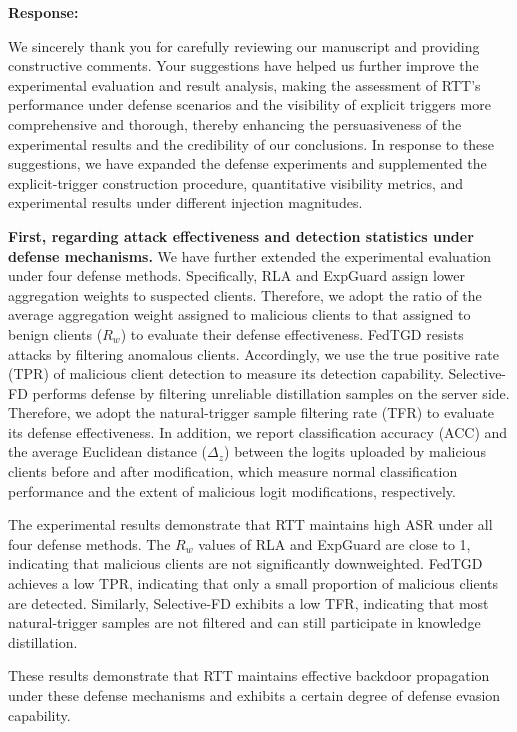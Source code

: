 \documentclass[11pt,a4paper]{article}
\newcommand{\manualindent}{\par\noindent\hspace*{1.5em}\ignorespaces}
\newcommand{\authorresponse}[1]{%
  {\bfseries\color{replyblue}Response:}\par
  #1\par\vspace{0.35em}%
}
\begin{document}
\authorresponse{\manualindent We sincerely thank you for carefully reviewing our manuscript and providing constructive comments.
Your suggestions have helped us further improve the experimental evaluation and result analysis, making the assessment of RTT's performance under defense scenarios and the visibility of explicit triggers more comprehensive and thorough, thereby enhancing the persuasiveness of the experimental results and the credibility of our conclusions. 
In response to these suggestions, we have expanded the defense experiments and supplemented the explicit-trigger construction procedure, quantitative visibility metrics, and experimental results under different injection magnitudes.

\manualindent \textbf{First, regarding attack effectiveness and detection statistics under defense mechanisms.}
We have further extended the experimental evaluation under four defense methods. 
Specifically, RLA and ExpGuard assign lower aggregation weights to suspected clients. Therefore, we adopt the ratio of the average aggregation weight assigned to malicious clients to that assigned to benign clients ($R_w$) to evaluate their defense effectiveness. 
FedTGD resists attacks by filtering anomalous clients. Accordingly, we use the true positive rate (TPR) of malicious client detection to measure its detection capability. 
Selective-FD performs defense by filtering unreliable distillation samples on the server side. Therefore, we adopt the natural-trigger sample filtering rate (TFR) to evaluate its defense effectiveness. 
In addition, we report classification accuracy (ACC) and the average Euclidean distance ($\Delta_z$) between the logits uploaded by malicious clients before and after modification, which measure normal classification performance and the extent of malicious logit modifications, respectively.

\manualindent The experimental results demonstrate that RTT maintains high ASR under all four defense methods. 
The $R_w$ values of RLA and ExpGuard are close to 1, indicating that malicious clients are not significantly downweighted. FedTGD achieves a low TPR, indicating that only a small proportion of malicious clients are detected. Similarly, Selective-FD exhibits a low TFR, indicating that most natural-trigger samples are not filtered and can still participate in knowledge distillation.

\manualindent These results demonstrate that RTT maintains effective backdoor propagation under these defense mechanisms and exhibits a certain degree of defense evasion capability.

}
\end{document}
